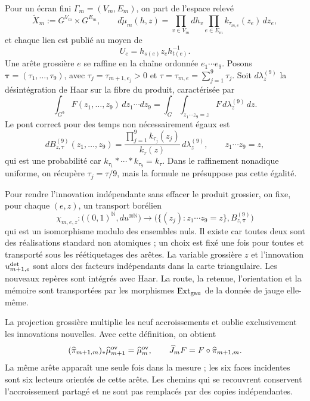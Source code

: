 Pour un écran fini $\Gamma_m=(V_m,E_m)$, on part de l'espace relevé
\begin{equation}\label{eq:pdf2-ym-owner-lifted-space}
 \widetilde X_m:=G^{V_m}\times G^{E_m},\qquad
 d\widetilde\mu_m(h,z)
 =\prod_{v\in V_m}dh_v\prod_{e\in E_m}k_{\tau_{m,e}}(z_e)\,dz_e,
\end{equation}
et chaque lien est publié au moyen de
\begin{equation}\label{eq:pdf2-ym-owner-link-publication}
 U_e=h_{s(e)}z_eh_{t(e)}^{-1}.
\end{equation}
Une arête grossière $e$ se raffine en la chaîne ordonnée $e_1\cdots e_9$. Posons \(\boldsymbol\tau=(\tau_1,\ldots,\tau_9)\), avec \(\tau_j=\tau_{m+1,e_j}>0\) et \(\tau=\tau_{m,e}=\sum_{j=1}^9\tau_j\). Soit \(d\lambda_z^{(9)}\) la désintégration de Haar sur la fibre du produit, caractérisée par
\[
 \int_{G^9}F(z_1,\ldots,z_9)\,dz_1\cdots dz_9
 =\int_G\int_{z_1\cdots z_9=z}
   F\,d\lambda_z^{(9)}\,dz.
\]
Le pont correct pour des temps non nécessairement égaux est
\begin{equation}\label{eq:pdf2-ym-owner-heat-bridge}
 dB_{z,\boldsymbol\tau}^{(9)}(z_1,\ldots,z_9)
 =\frac{\prod_{j=1}^9k_{\tau_j}(z_j)}{k_\tau(z)}
   \,d\lambda_z^{(9)},
 \qquad z_1\cdots z_9=z,
\end{equation}
qui est une probabilité car
\(k_{\tau_1}*\cdots*k_{\tau_9}=k_\tau\). Dans le raffinement nonadique uniforme, on
récupère \(\tau_j=\tau/9\), mais la formule ne présuppose pas cette égalité.

Pour rendre l'innovation indépendante sans effacer le produit grossier, on fixe, pour chaque $(e,z)$, un transport borélien
\begin{equation}\label{eq:pdf2-ym-owner-bridge-triangularization}
 \chi_{m,e,z}:\bigl((0,1)^{\mathbb N},du^{\otimes\mathbb N}\bigr)
 \longrightarrow
 \bigl(\{(z_j):z_1\cdots z_9=z\},B_{z,\boldsymbol\tau}^{(9)}\bigr)
\end{equation}
qui est un isomorphisme modulo des ensembles nuls. Il existe car toutes deux sont des réalisations
standard non atomiques ; un choix est fixé une fois pour toutes et transporté sous les
réétiquetages des arêtes. La variable grossière $z$ et l’innovation $u^{\rm det}_{m+1,e}$
sont alors des facteurs indépendants dans la carte triangulaire. Les nouveaux repères sont
intégrés avec Haar. La route, la retenue, l’orientation et la mémoire sont transportées par les
morphismes $\operatorname{Ext}_{\rm gau}$ de la donnée de jauge elle-même.

La projection grossière multiplie les neuf accroissements et oublie exclusivement les
innovations nouvelles. Avec cette définition, on obtient
\begin{equation}\label{eq:pdf2-ym-owner-projectivity}
 (\widehat\pi_{m+1,m})_*\widehat\mu_{m+1}^{\rm ov}
 =\widehat\mu_m^{\rm ov},\qquad
 \widehat J_mF=F\circ\widehat\pi_{m+1,m}.
\end{equation}
La même arête apparaît une seule fois dans la mesure ; les six faces incidentes sont six lecteurs orientés de cette arête. Les chemins qui se recouvrent conservent l'accroissement partagé et ne sont pas remplacés par des copies indépendantes.


